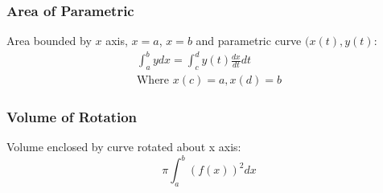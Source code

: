 \documentclass[../main]{subfiles}
\begin{document}
	\subsubsection{Area of Parametric}

	Area bounded by \(x\) axis, \(x=a\), \(x=b\) and parametric curve \((x(t),y(t)\): 
	\begin{equation*} \begin{gathered}
		\int_a^b y dx = \int_c^d y(t) \frac{dx}{dt} dt \\
		\text{Where } x(c) = a , x(d) = b 
	\end{gathered} \end{equation*}

	\subsubsection{Volume of Rotation}

	Volume enclosed by curve rotated about x axis:
		\[ \pi \int_a^b (f(x))^2 dx \]
\end{document}
